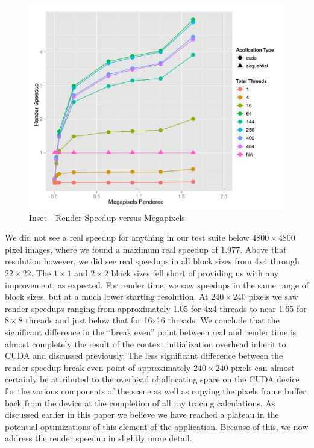 \documentclass[12pt]{article}
\begin{document}
\begin{figure}
    \caption{Inset---Render Speedup versus Megapixels} \label{fig:render_speedup_zoom}
    \begin{center}
\includegraphics{cudatrace-009}
    \end{center}
\end{figure}

We did not see a real speedup for anything in our test suite below $4800 \times 4800$ pixel images, where we found a maximum real speedup of 1.977. Above that resolution however, we did see real speedups in all block sizes from 4x4 through $22 \times 22$. The $1 \times 1$ and $2 \times 2$ block sizes fell short of providing us with any improvement, as expected. For render time, we saw speedups in the same range of block sizes, but at a much lower starting resolution. At $240 \times 240$ pixels we saw render speedups ranging from approximately 1.05 for 4x4 threads to near 1.65 for $8 \times 8$ threads and just below that for 16x16 threads. We conclude that the significant difference in the ``break even'' point between real and render time is almost completely the result of the context initialization overhead inherit to CUDA and discussed previously. The less significant difference between the render speedup break even point of approximately $240 \times 240$ pixels can almost certainly be attributed to the overhead of allocating space on the CUDA device for the various components of the scene as well as copying the pixels frame buffer back from the device at the completion of all ray tracing calculations. As discussed earlier in this paper we believe we have reached a plateau in the potential optimizations of this element of the application. Because of this, we now address the render speedup in slightly more detail.
\end{document}
